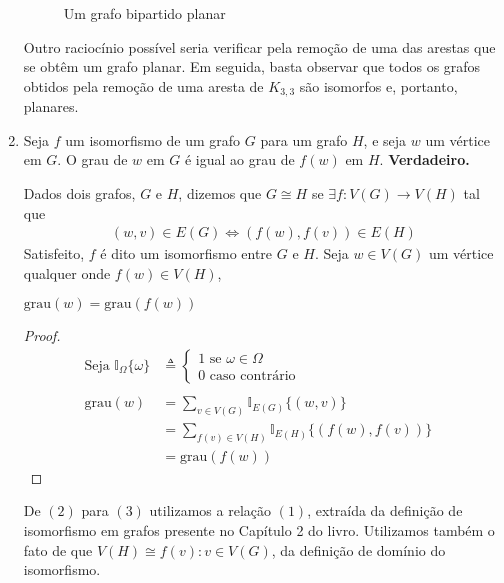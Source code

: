 \documentclass{homework}
\begin{document}
\begin{enumerate}[label=\textbf{\arabic*)}]
	\begin{figure}[H]
		\centering
		
		\caption{Um grafo bipartido planar}
		\label{fig:1.3.1}
	\end{figure}
	
	Outro raciocínio possível seria verificar pela remoção de uma das arestas que se obtêm um grafo planar. Em seguida, basta observar que todos os grafos obtidos pela remoção de uma aresta de $K_{3, 3}$ são isomorfos e, portanto, planares. \par
	
	\item Seja $f$ um isomorfismo de um grafo $G$ para um grafo $H$, e seja $w$ um vértice em $G$. O grau de $w$ em $G$ é igual ao grau de $f(w)$ em $H$. \textbf{Verdadeiro.} \par
	
	Dados dois grafos, $G$ e $H$, dizemos que $G \cong H$ se $\exists f : V(G) \to V(H)$ tal que
		\begin{align}
			(w, v) \in E(G) \iff (f(w), f(v)) \in E(H)
		\end{align}
	Satisfeito, $f$ é dito um isomorfismo entre $G$ e $H$. Seja $w \in V(G)$ um vértice qualquer onde $f(w) \in V(H)$,
	\begin{supposition}
		$\text{grau}(w) = \text{grau}(f(w))$
	\end{supposition}
	\begin{proof}
		\begin{align}
		\text{Seja } \mathbb{I}_{\Omega}\{\omega\} &\triangleq \begin{cases}
		1 \text{ se } \omega \in \Omega\\
		0 \text{ caso contrário}
		\end{cases} \nonumber \\
		~ \nonumber \\
		\text{grau}(w) &= \sum_{v \in V(G)} \mathbb{I}_{E(G)}\{(w, v)\}\\
					   &= \sum_{f(v) \in V(H)} \mathbb{I}_{E(H)}\{(f(w), f(v))\}\\
					   &= \text{grau}(f(w)) & \nonumber
		\end{align}
	\end{proof}

	De $(2)$ para $(3)$ utilizamos a relação $(1)$, extraída da definição de isomorfismo em grafos presente no Capítulo 2 do livro\cite{jayme:18}. Utilizamos também o fato de que $V(H) \cong {f(v) : v \in V(G)}$, da definição de domínio do isomorfismo. \par
	

\end{enumerate}
\end{document}
